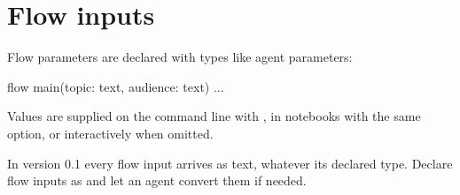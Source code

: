 \section{Flow inputs}

Flow parameters are declared with types like agent parameters:

\begin{algo}
flow main(topic: text, audience: text) { ... }
\end{algo}

Values are supplied on the command line with , in notebooks with the same option, or interactively when omitted.

\begin{note}
In version 0.1 every flow input arrives as text, whatever its declared type. Declare flow inputs as  and let an agent convert them if needed.
\end{note}
